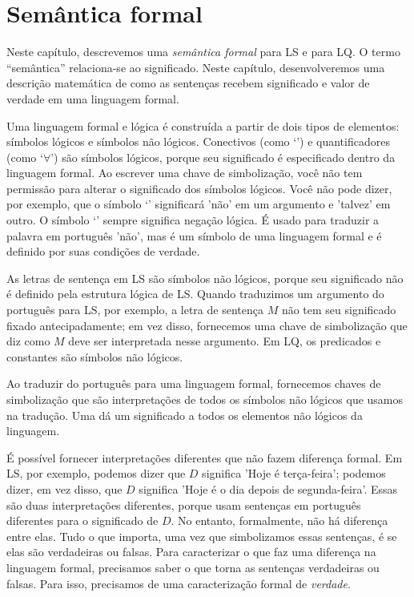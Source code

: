 \chapter{Semântica formal}
\label{ch.semantics}

Neste capítulo, descrevemos uma \emph{semântica formal} para LS e para LQ. O termo \enquote{semântica} relaciona-se ao significado. Neste capítulo, desenvolveremos uma descrição matemática de como as sentenças recebem significado e valor de verdade em uma linguagem formal.

Uma linguagem formal e lógica é construída a partir de dois tipos de elementos: símbolos lógicos e símbolos não lógicos. Conectivos (como `\eand') e quantificadores (como `$\forall$') são símbolos lógicos, porque seu significado é especificado dentro da linguagem formal. Ao escrever uma chave de simbolização, você não tem permissão para alterar o significado dos símbolos lógicos. Você não pode dizer, por exemplo, que o símbolo `\enot' significará 'não' em um argumento e 'talvez' em outro. O símbolo `\enot' sempre significa negação lógica. É usado para traduzir a palavra em português 'não', mas é um símbolo de uma linguagem formal e é definido por suas condições de verdade.

As letras de sentença em LS são símbolos não lógicos, porque seu significado não é definido pela estrutura lógica de LS. Quando traduzimos um argumento do português para LS, por exemplo, a letra de sentença $M$ não tem seu significado fixado antecipadamente; em vez disso, fornecemos uma chave de simbolização que diz como $M$ deve ser interpretada nesse argumento. Em LQ, os predicados e constantes são símbolos não lógicos.

Ao traduzir do português para uma linguagem formal, fornecemos chaves de simbolização que são interpretações de todos os símbolos não lógicos que usamos na tradução. Uma  dá um significado a todos os elementos não lógicos da linguagem.

É possível fornecer interpretações diferentes que não fazem diferença formal. Em LS, por exemplo, podemos dizer que $D$ significa 'Hoje é terça-feira'; podemos dizer, em vez disso, que $D$ significa 'Hoje é o dia depois de segunda-feira'. Essas são duas interpretações diferentes, porque usam sentenças em português diferentes para o significado de $D$. No entanto, formalmente, não há diferença entre elas. Tudo o que importa, uma vez que simbolizamos essas sentenças, é se elas são verdadeiras ou falsas. Para caracterizar o que faz uma diferença na linguagem formal, precisamos saber o que torna as sentenças verdadeiras ou falsas. Para isso, precisamos de uma caracterização formal de \emph{verdade}.


